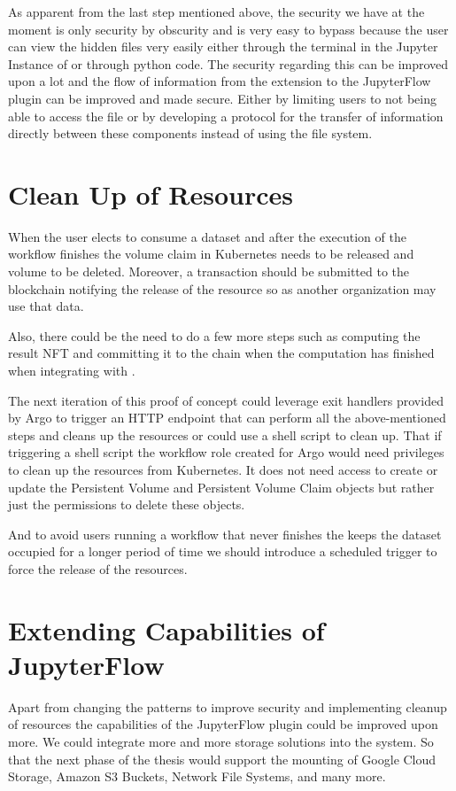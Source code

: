 As apparent from the last step mentioned above, the security we have at the moment is only security by obscurity and is very easy to bypass because the user can view the hidden files very easily either through the terminal in the Jupyter Instance of or through python code. The security regarding this can be improved upon a lot and the flow of information from the extension to the JupyterFlow plugin can be improved and made secure. Either by limiting users to not being able to access the file or by developing a protocol for the transfer of information directly between these components instead of using the file system. 

\section{Clean Up of Resources}
When the user elects to consume a dataset and after the execution of the workflow finishes the volume claim in Kubernetes needs to be released and volume to be deleted. Moreover, a transaction should be submitted to the blockchain notifying the release of the resource so as another organization may use that data.

\bigskip
Also, there could be the need to do a few more steps such as computing the result NFT and committing it to the chain when the computation has finished when integrating with \cite{nft-thesis}.

\bigskip
The next iteration of this proof of concept could leverage exit handlers \cite{argo-exit-handler} provided by Argo to trigger an HTTP endpoint that can perform all the above-mentioned steps and cleans up the resources or could use a shell script to clean up. That if triggering a shell script the workflow role created for Argo would need privileges to clean up the resources from Kubernetes. It does not need access to create or update the Persistent Volume and Persistent Volume Claim objects but rather just the permissions to delete these objects.

\bigskip
And to avoid users running a workflow that never finishes the keeps the dataset occupied for a longer period of time we should introduce a scheduled trigger to force the release of the resources.

\section{Extending Capabilities of JupyterFlow}
Apart from changing the patterns to improve security and implementing cleanup of resources the capabilities of the JupyterFlow plugin could be improved upon more. We could integrate more and more storage solutions into the system. So that the next phase of the thesis would support the mounting of Google Cloud Storage, Amazon S3 Buckets, Network File Systems, and many more.